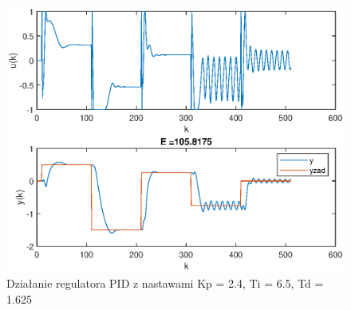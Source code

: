 		\begin{figure}[h!]
			\centering
			\includegraphics[width=\linewidth]{img/strojeniePID_Ziegler_Nichols.eps}
			\caption{Działanie regulatora PID z nastawami Kp = 2.4, Ti = 6.5, Td = 1.625}
			\label{fig:PID1}
		\end{figure}
		
		\newpage
